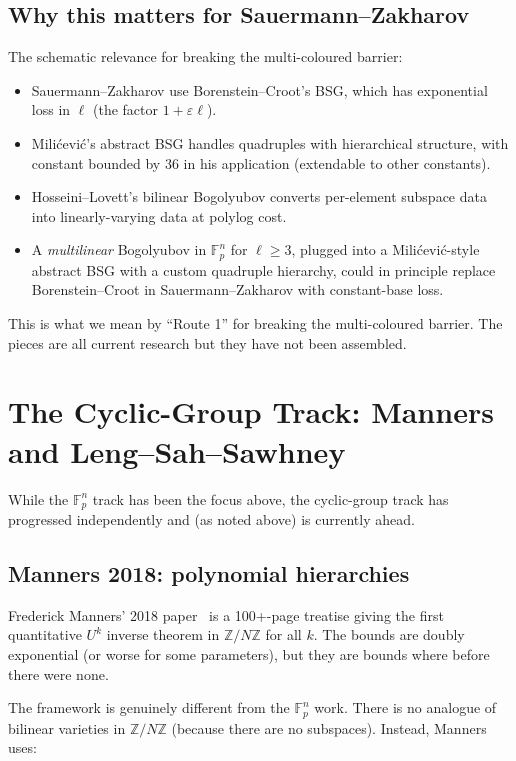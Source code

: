 \documentclass[11pt,a4paper]{article}
\theoremstyle{plain}
\theoremstyle{definition}
\theoremstyle{remark}
\newcommand{\F}{\mathbb{F}}
\newcommand{\Z}{\mathbb{Z}}
\begin{document}
\subsection{Why this matters for Sauermann--Zakharov}\label{sec:bogolyubov}

The schematic relevance for breaking the multi-coloured barrier:

\begin{itemize}[leftmargin=2em]
  \item Sauermann--Zakharov use Borenstein--Croot's BSG, which has exponential loss in $\ell$ (the factor $1 + \varepsilon \ell$).
  \item Milićević's abstract BSG handles quadruples with hierarchical structure, with constant bounded by 36 in his application (extendable to other constants).
  \item Hosseini--Lovett's bilinear Bogolyubov converts per-element subspace data into linearly-varying data at polylog cost.
  \item A \emph{multilinear} Bogolyubov in $\F_p^n$ for $\ell \geq 3$, plugged into a Milićević-style abstract BSG with a custom quadruple hierarchy, could in principle replace Borenstein--Croot in Sauermann--Zakharov with constant-base loss.
\end{itemize}

This is what we mean by ``Route 1'' for breaking the multi-coloured barrier. The pieces are all current research but they have not been assembled.

\section{The Cyclic-Group Track: Manners and Leng--Sah--Sawhney}

While the $\F_p^n$ track has been the focus above, the cyclic-group track has progressed independently and (as noted above) is currently ahead.

\subsection{Manners 2018: polynomial hierarchies}

Frederick Manners' 2018 paper~\cite{manners2018} is a 100+-page treatise giving the first quantitative $U^k$ inverse theorem in $\Z/N\Z$ for all $k$. The bounds are doubly exponential (or worse for some parameters), but they are bounds where before there were none.

The framework is genuinely different from the $\F_p^n$ work. There is no analogue of bilinear varieties in $\Z/N\Z$ (because there are no subspaces). Instead, Manners uses:
\end{document}
